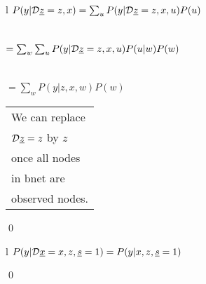 \begin{claim}
\label{cl-decWhy}
\decWhy
\end{claim}
\proof
\begin{longtable}{l}
\color{red}
$P(y|{\cal D}{\underline{z}}=z,x)=
\sum_u P(y|{\cal D}{\underline{z}}=z,x,u)P(u)
$
\\
\xymatrix{\\=}
\\
\\
\color{red}
$=\sum_w\sum_u
P(y|{\cal D}{\underline{z}}=z,x,u)P(u|w)P(w)
$
\\
\xymatrix{\\=}
\\
\\
\color{red}
$=\sum_w
P(y|z,x,w)P(w)
$
\\
\xymatrix{\\=}
\begin{tabular}{l}
We can replace\\
${\cal D}{\underline{z}}=z$
by $z$ 
\\once all nodes
\\in bnet are
\\observed nodes. 
\end{tabular}
\end{longtable}
\qed

\begin{claim}
\label{cl-decTransportTrivial}
\decTransportTrivial
\end{claim}
\proof
\begin{longtable}{l}
\color{red}
$P(y|{\cal D}{\underline{x}}=x, z, {\underline{s}}=1)=
P(y|x, z, {\underline{s}}=1)$
\\
\xymatrix{
\\=
}
\end{longtable}
\qed

